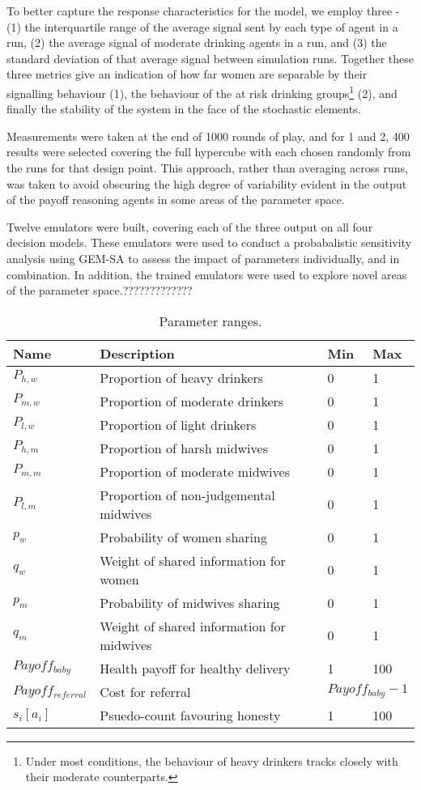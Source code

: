 To better capture the response characteristics for the model, we employ three - (1) the interquartile range of the average signal sent by each type of agent in a run, (2) the average signal of moderate drinking agents in a run, and (3) the standard deviation of that average signal between simulation runs. Together these three metrics give an indication of how far women are separable by their signalling behaviour (1), the behaviour of the at risk drinking groups\footnote{Under most conditions, the behaviour of heavy drinkers tracks closely with their moderate counterparts.} (2), and finally the stability of the system in the face of the stochastic elements.

Measurements were taken at the end of 1000 rounds of play, and for 1 and 2, 400 results were selected covering the full hypercube with each chosen randomly from the runs for that design point. This approach, rather than averaging across runs, was taken to avoid obscuring the high degree of variability evident in the output of the payoff reasoning agents in some areas of the parameter space.

Twelve emulators were built, covering each of the three output on all four decision models. These emulators were used to conduct a probabalistic sensitivity analysis using \ac{GEM-SA} to assess the impact of parameters individually, and in combination. In addition, the trained emulators were used to explore novel areas of the parameter space.?????????????

\begin{table}
\center
\begin{tabular} {|l | l | l| l|}
\hline
Name & Description & Min & Max \\ \hline
\(P_{h,w}\) & Proportion of heavy drinkers & 0 & 1 \\ \hline
\(P_{m,w}\) & Proportion of moderate drinkers & 0 & 1 \\ \hline
\(P_{l,w}\) & Proportion of light drinkers & 0 & 1 \\ \hline
\(P_{h,m}\) & Proportion of harsh midwives & 0 & 1 \\ \hline
\(P_{m,m}\) & Proportion of moderate midwives & 0 & 1 \\ \hline
\(P_{l,m}\) & Proportion of non-judgemental midwives & 0 & 1 \\ \hline
\(p_{w}\) & Probability of women sharing & 0 & 1 \\ \hline
\(q_{w}\) & Weight of shared information for women & 0 & 1 \\ \hline
\(p_{m}\) & Probability of midwives sharing & 0 & 1 \\ \hline
\(q_{m}\) & Weight of shared information for midwives & 0 & 1 \\ \hline
\(Payoff_{baby}\) & Health payoff for healthy delivery & 1 & 100 \\ \hline
\(Payoff_{referral}\) & Cost for referral & \multicolumn{2}{l|}{\(Payoff_{baby} - 1\)} \\ \hline
\(s_{i}[a_{i}]\) & Psuedo-count favouring honesty & 1 & 100 \\ \hline
\end{tabular}
\caption[Table caption text]{Parameter ranges. \label{tab:sa_params}}
\end{table}

